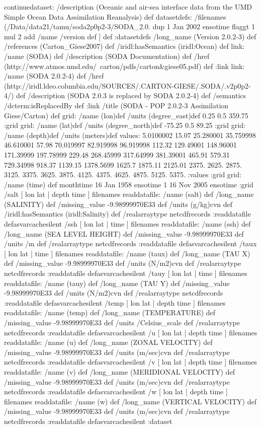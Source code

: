 \begin{ingrid}
continuedataset:
/description (Oceanic and air-sea interface data from the UMD Simple Ocean Data Assimilation Reanalysis) def
datasetdefs:
/filenames
{
(/Data/data21/tamu/soda2p0p2-3/SODA_2.0.%
dup
 1 Jan 2002 ensotime flaggt 1 mul 2 add /name /version def 
]
} def
:datasetdefs
/long_name (Version 2.0.2-3) def
/references (Carton_Giese2007) def
/iridl:hasSemantics (iridl:Ocean) def
link:
/name (SODA) def
/description (SODA Documentation) def
/href (http://www.atmos.umd.edu/~carton/pdfs/carton&giese05.pdf) def
:link
link:
/name (SODA 2.0.2-4) def
/href (http://iridl.ldeo.columbia.edu/SOURCES/.CARTON-GIESE/.SODA/.v2p0p2-4/) def
/description (SODA 2.0.3 is replaced by  SODA 2.0.2-4) def
/semantics /dcterm:isReplacedBy def
:link
/title (SODA - POP 2.0.2-3 Assimilation Giese/Carton) def
grid:
/name (lon)def
/units (degree_east)def
 0.25 0.5 359.75
:grid
grid:
/name (lat)def
/units (degree_north)def
 -75.25 0.5 89.25
:grid
grid:
/name (depth)def
/units (meters)def
values: 5.0100002 15.07 25.280001 35.759998 46.610001 57.98 70.019997 82.919998 96.919998 112.32 129.49001 148.96001 171.39999 197.78999 229.48 268.45999 317.64999 381.39001 465.91 579.31 729.34998 918.37 1139.15 1378.5699 1625.7 1875.11 2125.01 2375. 2625. 2875. 3125. 3375. 3625. 3875. 4125. 4375. 4625. 4875. 5125. 5375. :values
:grid
grid:
/name (time) def
monthtime
16 Jan 1958 ensotime
1
16 Nov 2005 ensotime
:grid
 /salt{
[ lon lat | depth time ] filenames readdatafile:
/name (salt) def
 /long_name (SALINITY) def
 /missing_value -9.98999970E33 def
 /units (g/kg)cvn def
/iridl:hasSemantics (iridl:Salinity) def
 /realarraytype netcdfrecords :readdatafile
}defasvarcachesilent
 /ssh{
[ lon lat | time ] filenames readdatafile:
/name (ssh) def
 /long_name (SEA LEVEL HEIGHT) def
 /missing_value -9.98999970E33 def
 /units /m def
 /realarraytype netcdfrecords :readdatafile
}defasvarcachesilent
 /taux{
[ lon lat | time ] filenames readdatafile:
/name (taux) def
 /long_name (TAU X) def
 /missing_value -9.98999970E33 def
 /units (N/m2)cvn def
 /realarraytype netcdfrecords :readdatafile
}defasvarcachesilent
 /tauy{
[ lon lat | time ] filenames readdatafile:
/name (tauy) def
 /long_name (TAU Y) def
 /missing_value -9.98999970E33 def
 /units (N/m2)cvn def
 /realarraytype netcdfrecords :readdatafile
}defasvarcachesilent
 /temp{
[ lon lat | depth time ] filenames readdatafile:
/name (temp) def
 /long_name (TEMPERATURE) def
 /missing_value -9.98999970E33 def
 /units /Celsius_scale def
 /realarraytype netcdfrecords :readdatafile
}defasvarcachesilent
 /u{
[ lon lat | depth time ] filenames readdatafile:
/name (u) def
 /long_name (ZONAL VELOCITY) def
 /missing_value -9.98999970E33 def
 /units (m/sec)cvn def
 /realarraytype netcdfrecords :readdatafile
}defasvarcachesilent
 /v{
[ lon lat | depth time ] filenames readdatafile:
/name (v) def
 /long_name (MERIDIONAL VELOCITY) def
 /missing_value -9.98999970E33 def
 /units (m/sec)cvn def
 /realarraytype netcdfrecords :readdatafile
}defasvarcachesilent
 /w{
[ lon lat | depth time ] filenames readdatafile:
/name (w) def
 /long_name (VERTICAL VELOCITY) def
 /missing_value -9.98999970E33 def
 /units (m/sec)cvn def
 /realarraytype netcdfrecords :readdatafile
}defasvarcachesilent
:dataset
\end{ingrid}
